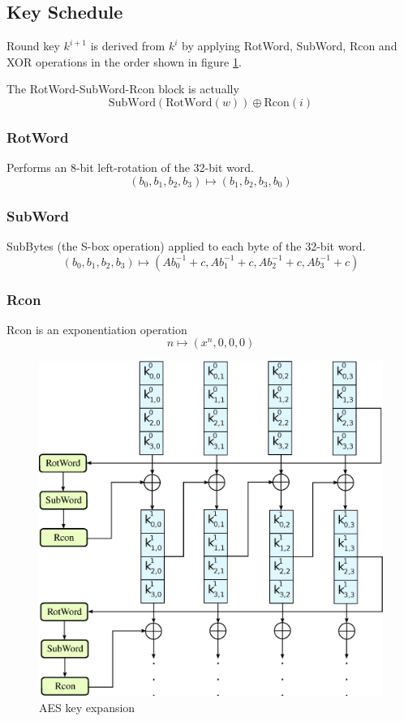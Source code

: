 \documentclass[a4paper]{scrartcl}
\begin{document}
\subsection{Key Schedule}

Round key $k^{i+1}$ is derived from $k^{i}$ by applying RotWord, SubWord, Rcon and XOR operations
in the order shown in figure \ref{aesschedule}.

The RotWord-SubWord-Rcon block is actually
\[\mathrm{SubWord}(\mathrm{RotWord}(w))\oplus \mathrm{Rcon}(i)\]

\subsubsection{RotWord}

Performs an 8-bit left-rotation of the 32-bit word.
\[(b_0,b_1,b_2,b_3)\mapsto(b_1,b_2,b_3,b_0)\]

\subsubsection{SubWord}

SubBytes (the S-box operation) applied to each byte of the 32-bit word.
\[(b_0,b_1,b_2,b_3)\mapsto(Ab_0^{-1}+c,Ab_1^{-1}+c,Ab_2^{-1}+c,Ab_3^{-1}+c)\]

\subsubsection{Rcon}

Rcon is an exponentiation operation
\[n\mapsto (x^n, 0, 0, 0)\]

\begin{figure}
    \centering
    \includegraphics[scale=0.28]{images/aes-schedule.eps}
    \caption{AES key expansion}
    \label{aesschedule}
\end{figure}
\end{document}
